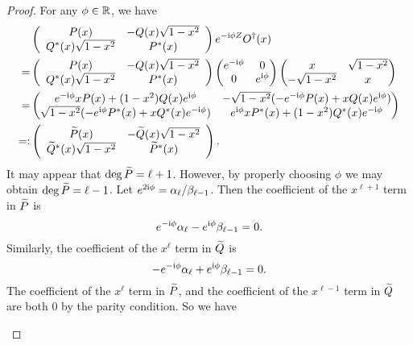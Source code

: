 \begin{proof}
For any $\phi\in \mathbb{R}$, we have
\begin{equation}
\begin{split}
&\left( \begin{array}{cc}
        P(x) & -Q(x) \sqrt{1 - x^2}\\
        Q^*(x) \sqrt{1 - x^2} & P^*(x)
        \end{array} \right)
e^{-\mathrm{i} \phi Z}O^{\dag}(x)\\
=&\left( \begin{array}{cc}
        P(x) & -Q(x) \sqrt{1 - x^2}\\
        Q^*(x) \sqrt{1 - x^2} & P^*(x)
        \end{array} \right)
\begin{pmatrix}
e^{-\mathrm{i} \phi} & 0\\
0 & e^{\mathrm{i} \phi}
\end{pmatrix}\begin{pmatrix}
x & \sqrt{1-x^2}\\
-\sqrt{1-x^2} & x
\end{pmatrix}\\
=&\begin{pmatrix}
e^{-\mathrm{i} \phi}xP(x)+(1-x^2) Q(x) e^{\mathrm{i} \phi}& -\sqrt{1-x^2}(-e^{-\mathrm{i} \phi}P(x)+xQ(x)e^{\mathrm{i} \phi})\\
\sqrt{1-x^2}(-e^{\mathrm{i} \phi}P^*(x)+xQ^*(x)e^{-\mathrm{i} \phi}) & e^{\mathrm{i} \phi}xP^*(x)+(1-x^2)Q^*(x) e^{-\mathrm{i} \phi}
\end{pmatrix}\\
=:&  \left( \begin{array}{cc}
        \widetilde{P}(x) & -\widetilde{Q}(x) \sqrt{1 - x^2}\\
        \widetilde{Q}^*(x) \sqrt{1 - x^2} & \widetilde{P}^*(x)
        \end{array} \right).
\end{split}
\end{equation}
It may appear that $\deg{\widetilde{P}}=\ell+1$. However, by properly choosing $\phi$ we may obtain $\deg{\widetilde{P}}=\ell-1$. 
Let $e^{2\mathrm{i} \phi}=\alpha_{\ell}/\beta_{\ell-1}$. Then the coefficient of the $x^{\ell+1}$ term in $\widetilde{P}$ is 
\begin{equation}
e^{-\mathrm{i} \phi}\alpha_{\ell}-e^{\mathrm{i} \phi}\beta_{\ell-1}=0.
\end{equation}
Similarly, the coefficient of the $x^{\ell}$ term in $\widetilde{Q}$ is
\begin{equation}
-e^{-\mathrm{i} \phi}\alpha_{\ell}+e^{\mathrm{i} \phi}\beta_{\ell-1}=0.
\end{equation}
The coefficient of the $x^{\ell}$ term in $\widetilde{P}$, and the coefficient of the $x^{\ell-1}$ term in $\widetilde{Q}$ are both $0$ by the parity condition.
So we have 
\begin{enumerate}


\end{enumerate}
\end{proof}
